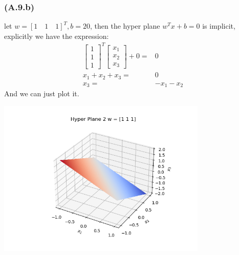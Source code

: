 \documentclass[]{article}
\begin{document}
        \subsubsection*{(A.9.b)}
            let $w = [1\quad 1\quad 1]^T, b = 20$, then the hyper plane $w^Tx + b = 0$ is implicit, explicitly we have the expression: 
            \begin{align*}\tag{1.9.b.1}\label{eqn:1.9.b.1}
                \begin{bmatrix}
                    1 \\ 1 \\ 1
                \end{bmatrix}^T 
                \begin{bmatrix}
                    x_1 \\ x_2 \\ x_3
                \end{bmatrix}
                + 0
                =&
                0
                \\
                x_1 + x_2 + x_3 =& 0
                \\
                x_3 =& -x_1 - x_2
            \end{align*}
            And we can just plot it.
            \begin{center}
                \includegraphics[width=10cm]{hyperplane2.png}
            \end{center}
            
\end{document}
